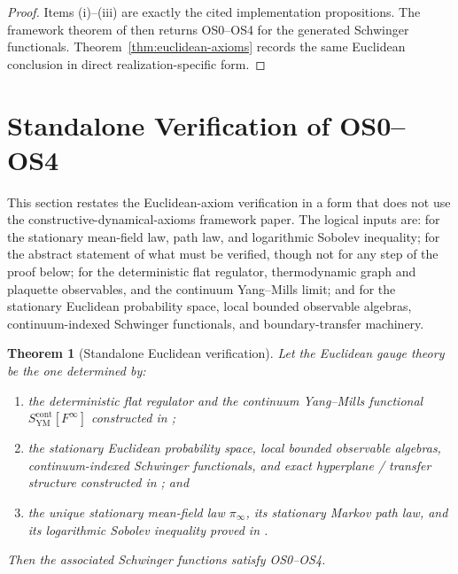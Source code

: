 \documentclass[11pt]{article}
\newtheorem{theorem}{Theorem}[section]
\theoremstyle{definition}
\theoremstyle{remark}
\begin{document}
\begin{proof}
Items \textnormal{(i)}--\textnormal{(iii)} are exactly the cited implementation
propositions.  The framework theorem of \cite{axioms} then returns OS0--OS4 for
the generated Schwinger functionals.  Theorem~\ref{thm:euclidean-axioms}
records the same Euclidean conclusion in direct realization-specific form.
\end{proof}

\section{Standalone Verification of OS0--OS4}
\label{sec:os-standalone}

This section restates the Euclidean-axiom verification in a form that does not
use the constructive-dynamical-axioms framework paper.  The logical inputs are:
\cite{convergence} for the stationary mean-field law, path law, and logarithmic
Sobolev inequality; \cite{axioms} for the abstract statement of what must be
verified, though not for any step of the proof below; \cite{lattice} for the
deterministic flat regulator, thermodynamic graph and plaquette observables,
and the continuum Yang--Mills limit; and \cite{quantization} for the stationary
Euclidean probability space, local bounded observable algebras,
continuum-indexed Schwinger functionals, and boundary-transfer machinery.

\begin{theorem}[Standalone Euclidean verification]
\label{thm:os-standalone}
Let the Euclidean gauge theory be the one determined by:
\begin{enumerate}[label=\textnormal{(\roman*)},leftmargin=1.5em]
\item the deterministic flat regulator and the continuum Yang--Mills functional
$S_{\mathrm{YM}}^{\mathrm{cont}}[F^\infty]$ constructed in
\cite{lattice};
\item the stationary Euclidean probability space, local bounded observable
algebras, continuum-indexed Schwinger functionals, and exact hyperplane /
transfer structure constructed in \cite{quantization}; and
\item the unique stationary mean-field law $\pi_\infty$, its stationary Markov
path law, and its logarithmic Sobolev inequality proved in \cite{convergence}.
\end{enumerate}
Then the associated Schwinger functions satisfy OS0--OS4.
\end{theorem}
\end{document}
